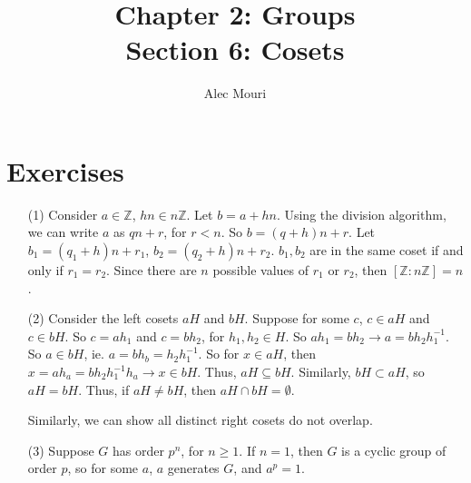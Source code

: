 \documentclass[12pt]{article}
\begin{document}
\title{Chapter 2: Groups \\ Section 6: Cosets}
\author{Alec Mouri}

\maketitle
\section*{Exercises}
\begin{itemize}
\item[(1)]
Consider $a \in \mathbb{Z}$, $hn \in n\mathbb{Z}$. Let $b = a + hn$. Using the division algorithm, we can write $a$ as $qn + r$, for $r < n$. So $b = (q + h)n + r$. Let $b_1 = (q_1 + h)n + r_1$, $b_2 = (q_2 + h)n + r_2$. $b_1, b_2$ are in the same coset if and only if $r_1 = r_2$. Since there are $n$ possible values of $r_1$ or $r_2$, then $[\mathbb{Z} : n\mathbb{Z}] = n$.
\item[(2)]
Consider the left cosets $aH$ and $bH$. Suppose for some $c$, $c \in aH$ and $c \in bH$. So $c = ah_1$ and $c = bh_2$, for $h_1, h_2 \in H$. So $ah_1 = bh_2 \rightarrow a = bh_2h_1^{-1}$. So $a \in bH$, ie. $a = bh_b = h_2h_1^{-1}$. So for $x \in aH$, then $x = ah_a = bh_2h_1^{-1}h_a \rightarrow x \in bH$. Thus, $aH \subseteq bH$. Similarly, $bH \subset aH$, so $aH = bH$. Thus, if $aH \neq bH$, then $aH \cap bH = \emptyset$.

Similarly, we can show all distinct right cosets do not overlap.
\item[(3)]
Suppose $G$ has order $p^n$, for $n \geq 1$. If $n = 1$, then $G$ is a cyclic group of order $p$, so for some $a$, $a$ generates $G$, and $a^p = 1$.


\end{itemize}
\end{document}

